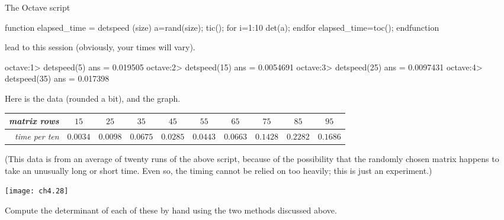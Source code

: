 \begin{exercises}
\begin{answer}
\begin{exparts}
          The Octave script
\begin{computercode}
function elapsed_time = detspeed (size)
  a=rand(size);
  tic();
  for i=1:10
     det(a);
  endfor
  elapsed_time=toc();
endfunction
\end{computercode}  
          lead to this session (obviously, your times will vary). 
\begin{computercode}
octave:1> detspeed(5)
ans = 0.019505
octave:2> detspeed(15)
ans = 0.0054691
octave:3> detspeed(25)
ans = 0.0097431
octave:4> detspeed(35)
ans = 0.017398
\end{computercode}  
          \partsitem Here is the data (rounded a bit), and the graph.
            \begin{center}
              \begin{tabular}{r|ccccccccc}
                 \textit{matrix rows} 
                    &$15$ &$25$ &$35$ &$45$ &$55$ &$65$ &$75$ &$85$ &$95$ \\
                 \hline
                 \textit{time per ten}
                    &$0.0034$                     
                    &$0.0098$
                    &$0.0675$
                    &$0.0285$ 
                    &$0.0443$
                    &$0.0663$ 
                    &$0.1428$  
                    &$0.2282$ 
                    &$0.1686$              
              \end{tabular}
            \end{center}
          (This data is from an average of twenty runs of the above script,
          because of the possibility that the randomly chosen matrix
          happens to take an unusually long or short time.
          Even so, the timing cannot be relied on too heavily; this is
          just an experiment.)
          \begin{center}
            \texttt{[image: ch4.28]}
          \end{center}
      \end{exparts}
    \end{answer}
  \item 
    Compute the determinant of each of these by hand using the 
    two methods discussed above.
\end{exercises}

